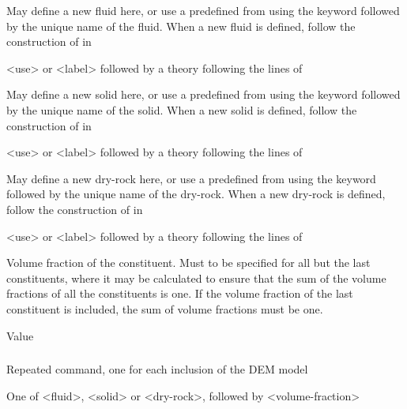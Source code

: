 {
 \slist
   \item \Description May define a new fluid here, or use a predefined  from  using the keyword  followed by the unique name of the fluid. When a new fluid is defined, follow the construction of  in 
   \item \Argument <use> or <label> followed by a theory following the lines of 
   \item \Default
 \elist

 \slist
   \item \Description May define a new solid here, or use a predefined  from  using the keyword  followed by the unique name of the solid. When a new solid is defined, follow the construction of  in 
   \item \Argument <use> or <label> followed by a theory following the lines of 
   \item \Default
 \elist

 \slist
   \item \Description  May define a new dry-rock here, or use a predefined  from  using the keyword  followed by the unique name of the dry-rock. When a new dry-rock is defined, follow the construction of  in 
   \item \Argument <use> or <label> followed by a theory following the lines of 
   \item \Default
 \elist

 \slist
   \item \Description Volume fraction of the constituent. Must to be specified for all but the last constituents, where it may be calculated to ensure that the sum of the volume fractions of all the constituents is one. If the volume fraction of the last constituent is included, the sum of volume fractions must be one. 
   \item \Argument Value
   \item \Default
 \elist

\subparagraph{}
 \slist
   \item \Description Repeated command, one for each inclusion of the DEM model
   \item \Argument One of <fluid>, <solid> or <dry-rock>, followed by <volume-fraction>
   \item \Default
 \elist

}
